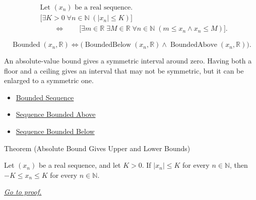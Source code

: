 \begin{remark*}
\[
\begin{aligned}
&\text{Let } (x_n) \text{ be a real sequence.}\\
&\bigl[
\exists K > 0\;
\forall n \in \mathbb{N}\;(|x_n| \le K)
\bigr]\\
&\qquad\Longleftrightarrow\qquad
\bigl[
\exists m \in \mathbb{R}\;
\exists M \in \mathbb{R}\;
\forall n \in \mathbb{N}\;(m \le x_n \land x_n \le M)
\bigr].
\end{aligned}
\]
\end{remark*}

\begin{remark*}
\[
\operatorname{Bounded}(x_n,\mathbb{R})
\Longleftrightarrow
\bigl(
\operatorname{BoundedBelow}(x_n,\mathbb{R})
\land
\operatorname{BoundedAbove}(x_n,\mathbb{R})
\bigr).
\]
\end{remark*}

\begin{remark*}[Interpretation]
An absolute-value bound gives a symmetric interval around zero. Having both a
floor and a ceiling gives an interval that may not be symmetric, but it can be
enlarged to a symmetric one.
\end{remark*}

\begin{dependencies}
\begin{itemize}
  \item \hyperref[def:bounded-sequence]{Bounded Sequence}
  \item \hyperref[def:sequence-bounded-above]{Sequence Bounded Above}
  \item \hyperref[def:sequence-bounded-below]{Sequence Bounded Below}
\end{itemize}
\end{dependencies}


\begin{theorembox}{Theorem (Absolute Bound Gives Upper and Lower Bounds)}
\begin{theorem}
\label{thm:absolute-bound-upper-lower-bounds}
Let $(x_n)$ be a real sequence, and let $K > 0$. If $|x_n| \le K$ for every
$n \in \mathbb{N}$, then $-K \le x_n \le K$ for every
$n \in \mathbb{N}$.

\smallskip
\noindent
\hyperref[prf:absolute-bound-upper-lower-bounds]{\textit{Go to proof.}}
\end{theorem}
\end{theorembox}

